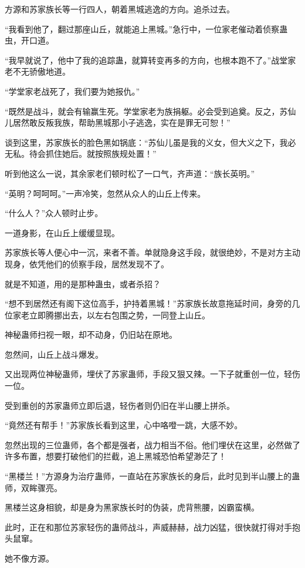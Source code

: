 \begin{this_body}
方源和苏家族长等一行四人，朝着黑城逃逸的方向。追杀过去。

“我看到他了，翻过那座山丘，就能追上黑城。”急行中，一位家老催动着侦察蛊虫，开口道。

“我早就说了，他中了我的追踪蛊，就算转变再多的方向，也根本跑不了。”战堂家老不无骄傲地道。

“学堂家老战死了，我们要为她报仇。”

“既然是战斗，就会有输赢生死。学堂家老为族捐躯。必会受到追奠。反之，苏仙儿居然敢反叛我族，帮助黑城那小子逃逸，实在是罪无可恕！”

谈到这里，苏家族长的脸色黑如锅底：“苏仙儿虽是我的义女，但大义之下，我必无私。待会抓住她后。就按照族规处置！”

听到他这么一说，其余家老们顿时松了一口气，齐声道：“族长英明。”

“英明？呵呵呵。”一声冷笑，忽然从众人的山丘上传来。

“什么人？”众人顿时止步。

一道身影，在山丘上缓缓显现。

苏家族长等人便心中一沉，来者不善。单就隐身这手段，就很绝妙，不是对方主动现身，依凭他们的侦察手段，居然发现不了。

就是不知道，用的是那种蛊虫，或者杀招？

“想不到居然还有阁下这位高手，护持着黑城！”苏家族长故意拖延时间，身旁的几位家老立即腾挪出去，以左右包围之势，一同登上山丘。

神秘蛊师扫视一眼，却不动身，仍旧站在原地。

忽然间，山丘上战斗爆发。

又出现两位神秘蛊师，埋伏了苏家蛊师，手段又狠又辣。一下子就重创一位，轻伤一位。

受到重创的苏家蛊师立即后退，轻伤者则仍旧在半山腰上拼杀。

“竟然还有帮手！”苏家族长看到这里，心中咯噔一跳，大感不妙。

忽然出现的三位蛊师，各个都是强者，战力相当不俗。他们埋伏在这里，必然做了许多布置，想要打破他们的拦截，追上黑城恐怕希望渺茫了！

“黑楼兰！”方源身为治疗蛊师，一直站在苏家族长的身后，此时见到半山腰上的蛊师，双眸骤亮。

黑楼兰这身相貌，却是身为黑家族长时的伪装，虎背熊腰，凶霸蛮横。

此时，正在和那位苏家轻伤的蛊师战斗，声威赫赫，战力凶猛，很快就打得对手抱头鼠窜。

她不像方源。


\end{this_body}
